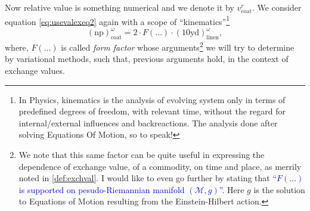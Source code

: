 \documentclass[12pt]{extarticle}
\theoremstyle{definition}
\begin{document}
Now relative value is something numerical and we denote it by $v_{\text{coat}}^{r}$.  We consider equation \ref{eq:usevalexeq2} again with a scope of ``kinematics''\footnote{In Physics, kinematics is the analysis of evolving system only in terms of predefined degrees of freedom, with relevant time, without the regard for internal/external influences and backreactions.  The analysis done after solving Equations Of Motion, so to speak!}
\begin{equation}
  \label{eq:valreltestvar}
  (\text{np})_{\text{coat}}^{\omega} = 2\cdot F(\ldots)\cdot (10\text{yd})_{\text{linen}}^{\omega},
\end{equation}
where, $F(\ldots)$ is called \emph{form factor} whose arguments\footnote{We note that this same factor can be quite useful in expressing the dependence of exchange value, of a commodity, on time and place, as merrily noted in \ref{def:exchval}.  I would like to even go further by stating that ``\textcolor{blue}{$F(\ldots)$ is supported on pesudo-Riemannian manifold $(\mathcal{M}, g)$''}.  Here $g$ is the solution to Equations of Motion resulting from the Einstein-Hilbert action.} we will try to determine by variational methods, such that, previous arguments hold, in the context of exchange values.
\end{document}
